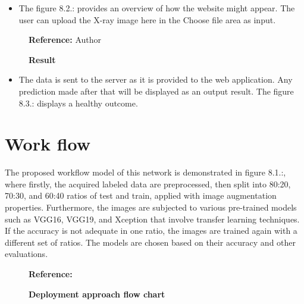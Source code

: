 \begin{itemize}
	\item	The figure 8.2.: provides an overview of how the website might appear. The user can upload the X-ray image here in the Choose file area as input.
	
\end{itemize}

\medskip




\begin{figure}
	\centering
	\caption{\textbf{Result}}
	\footnotesize \textbf{Reference:} Author
	\label{fig:Result}
\end{figure}



\begin{itemize}
	\item	The data is sent to the server as it is provided to the web application. Any prediction made after that will be displayed as an output result. The figure 8.3.: displays a healthy outcome.
	
\end{itemize}


\bigskip

\section{Work flow}

The proposed workflow model of this network is demonstrated in figure 8.1.:, where firstly, the acquired labeled data are preprocessed, then split into 80:20, 70:30, and 60:40 ratios of test and train, applied with image augmentation properties. Furthermore, the images are subjected to various pre-trained models such as VGG16, VGG19, and Xception that involve transfer learning techniques. If the accuracy is not adequate in one ratio, the images are trained again with a different set of ratios. The models are chosen based on their accuracy and other evaluations.\cite{jain2022deep}

\begin{figure}
	\centering
	\caption{\textbf{Deployment approach flow chart}}
	\footnotesize \textbf{Reference:}\cite{jain2022deep}
	\label{fig:Deployment Approach}
\end{figure}


